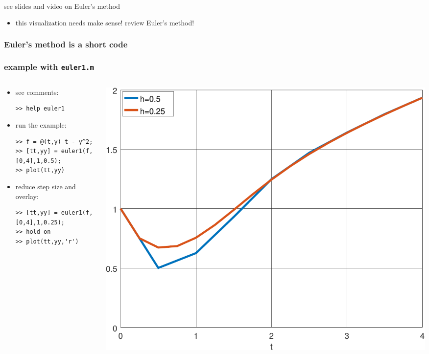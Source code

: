 \documentclass[urlcolor=blue,dvipsnames]{beamer}
\begin{document}
\begin{frame}{see slides and video on Euler's method}
\begin{itemize}
    \begin{itemize}
    \item this visualization needs make sense! review Euler's method!
    \end{itemize}
\end{itemize}
\end{frame}


\begin{frame}[fragile]
\frametitle{Euler's method is a short code}

\bigskip
{}
\end{frame}


\begin{frame}[fragile]
\frametitle{example with \texttt{euler1.m}}

\begin{columns}
\begin{column}{0.55\textwidth}
\begin{itemize}
\item see comments:
\begin{Verbatim}[fontsize=\footnotesize]
>> help euler1
\end{Verbatim}
\item run the example:
\begin{Verbatim}[fontsize=\footnotesize]
>> f = @(t,y) t - y^2;
>> [tt,yy] = euler1(f,[0,4],1,0.5);
>> plot(tt,yy)
\end{Verbatim}
\item reduce step size and overlay:
\begin{Verbatim}[fontsize=\footnotesize]
>> [tt,yy] = euler1(f,[0,4],1,0.25);
>> hold on
>> plot(tt,yy,'r')
\end{Verbatim}
\end{itemize}
\end{column}
\begin{column}{0.45\textwidth}

\mbox{\quad \includegraphics[width=\textwidth]{figs/euler1basic}}
\end{column}
\end{columns}
\end{frame}
\end{document}
